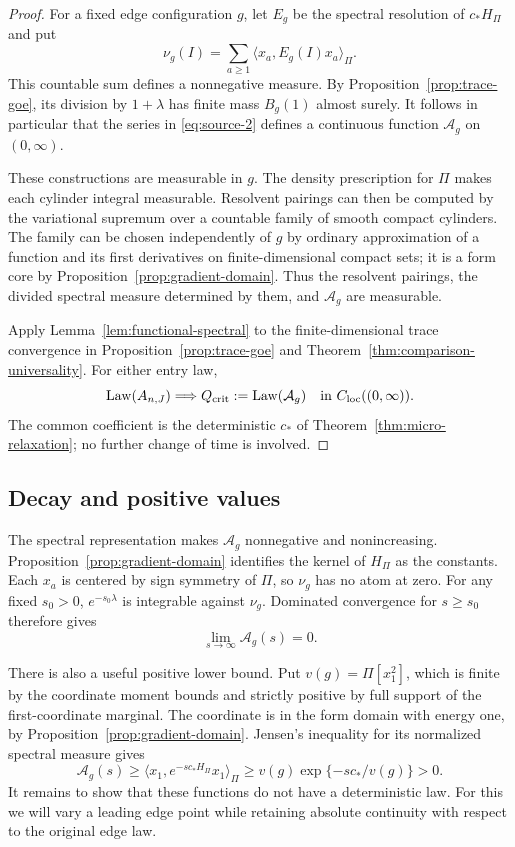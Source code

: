 \begin{proof}
For a fixed edge configuration $g$, let $E_g$ be the spectral resolution
of $c_*H_\Pi$ and put
\[
 \nu_g(I)=\sum_{a\geq1}\langle x_a,E_g(I)x_a\rangle_\Pi.
\]
This countable sum defines a nonnegative measure.  By
Proposition~\ref{prop:trace-goe}, its division by $1+\lambda$ has
finite mass $B_g(1)$ almost surely.  It follows in particular that
the series in \eqref{eq:source-2} defines a continuous function
$\mathcal A_g$ on $(0,\infty)$.

These constructions are measurable in $g$.  The density prescription
for $\Pi$ makes each cylinder integral measurable.  Resolvent pairings
can then be computed by the variational supremum over a countable
family of smooth compact cylinders.  The family can be chosen
independently of $g$ by ordinary approximation of a function and its
first derivatives on finite-dimensional compact sets; it is a form
core by Proposition~\ref{prop:gradient-domain}.  Thus the resolvent
pairings, the divided spectral measure determined by them, and
$\mathcal A_g$ are measurable.

Apply Lemma~\ref{lem:functional-spectral} to the finite-dimensional
trace convergence in Proposition~\ref{prop:trace-goe} and
Theorem~\ref{thm:comparison-universality}.  For either entry law,
\[
 \operatorname{Law}(A_{n,J})\Longrightarrow
 Q_{\rm crit}:=\operatorname{Law}(\mathcal A_g)
 \quad\text{in }C_{\rm loc}((0,\infty)).
\]
The common coefficient is the deterministic $c_*$ of
Theorem~\ref{thm:micro-relaxation}; no further change of time is involved.
\end{proof}

\subsection{Decay and positive values}

The spectral representation makes $\mathcal A_g$ nonnegative and
nonincreasing.  Proposition~\ref{prop:gradient-domain} identifies the
kernel of $H_\Pi$ as the constants.  Each $x_a$ is centered by sign
symmetry of $\Pi$, so $\nu_g$ has no atom at zero.  For any fixed
$s_0>0$, $e^{-s_0\lambda}$ is integrable against $\nu_g$.
Dominated convergence for $s\geq s_0$ therefore gives
\[
 \lim_{s\to\infty}\mathcal A_g(s)=0.
\]

There is also a useful positive lower bound.  Put
$v(g)=\Pi[x_1^2]$, which is finite by the coordinate moment bounds and
strictly positive by full support of the first-coordinate marginal.
The coordinate is
in the form domain with energy one, by
Proposition~\ref{prop:gradient-domain}.  Jensen's inequality for its
normalized spectral measure gives
\begin{equation}
 \mathcal A_g(s)\geq
 \langle x_1,e^{-s c_*H_\Pi}x_1\rangle_\Pi
 \geq v(g)\exp\{-s c_*/v(g)\}>0.
 \label{eq:functional-positive}
\end{equation}
It remains to show that these functions do not have a deterministic law.
For this we will vary a leading edge point while retaining absolute
continuity with respect to the original edge law.

